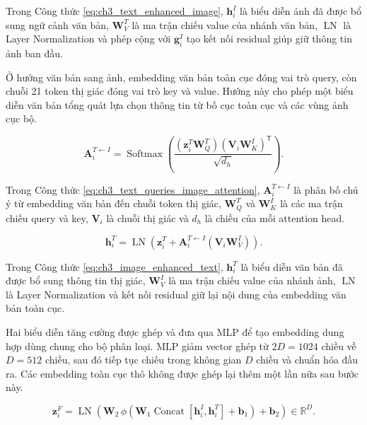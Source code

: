 Trong Công thức \ref{eq:ch3_text_enhanced_image}, $\boldsymbol{h}_{i}^{I}$ là biểu diễn ảnh đã được bổ sung ngữ cảnh văn bản, $\boldsymbol{W}_{V}^{T}$ là ma trận chiếu value của nhánh văn bản, $\operatorname{LN}$ là Layer Normalization và phép cộng với $\boldsymbol{g}_{i}^{I}$ tạo kết nối residual giúp giữ thông tin ảnh ban đầu.

Ở hướng văn bản sang ảnh, embedding văn bản toàn cục đóng vai trò query, còn chuỗi 21 token thị giác đóng vai trò key và value. Hướng này cho phép một biểu diễn văn bản tổng quát lựa chọn thông tin từ bố cục toàn cục và các vùng ảnh cục bộ.

\begin{equation}\boldsymbol{A}_{i}^{T\leftarrow I}=\operatorname{Softmax}\left(\frac{\left(\boldsymbol{z}_{i}^{T}\boldsymbol{W}_{Q}^{T}\right)\left(\boldsymbol{V}_{i}\boldsymbol{W}_{K}^{I}\right)^{\mathsf{T}}}{\sqrt{d_{h}}}\right).\label{eq:ch3_text_queries_image_attention}\end{equation}

Trong Công thức \ref{eq:ch3_text_queries_image_attention}, $\boldsymbol{A}_{i}^{T\leftarrow I}$ là phân bố chú ý từ embedding văn bản đến chuỗi token thị giác, $\boldsymbol{W}_{Q}^{T}$ và $\boldsymbol{W}_{K}^{I}$ là các ma trận chiếu query và key, $\boldsymbol{V}_{i}$ là chuỗi thị giác và $d_h$ là chiều của mỗi attention head.

\begin{equation}\boldsymbol{h}_{i}^{T}=\operatorname{LN}\left(\boldsymbol{z}_{i}^{T}+\boldsymbol{A}_{i}^{T\leftarrow I}\left(\boldsymbol{V}_{i}\boldsymbol{W}_{V}^{I}\right)\right).\label{eq:ch3_image_enhanced_text}\end{equation}

Trong Công thức \ref{eq:ch3_image_enhanced_text}, $\boldsymbol{h}_{i}^{T}$ là biểu diễn văn bản đã được bổ sung thông tin thị giác, $\boldsymbol{W}_{V}^{I}$ là ma trận chiếu value của nhánh ảnh, $\operatorname{LN}$ là Layer Normalization và kết nối residual giữ lại nội dung của embedding văn bản toàn cục.

Hai biểu diễn tăng cường được ghép và đưa qua MLP để tạo embedding dung hợp dùng chung cho bộ phân loại. MLP giảm vector ghép từ $2D=1024$ chiều về $D=512$ chiều, sau đó tiếp tục chiếu trong không gian $D$ chiều và chuẩn hóa đầu ra. Các embedding toàn cục thô không được ghép lại thêm một lần nữa sau bước này.

\begin{equation}\boldsymbol{z}_{i}^{F}=\operatorname{LN}\left(\boldsymbol{W}_{2}\,\phi\left(\boldsymbol{W}_{1}\operatorname{Concat}\left[\boldsymbol{h}_{i}^{I},\boldsymbol{h}_{i}^{T}\right]+\boldsymbol{b}_{1}\right)+\boldsymbol{b}_{2}\right)\in\mathbb{R}^{D}.\label{eq:ch3_fused_embedding}\end{equation}

